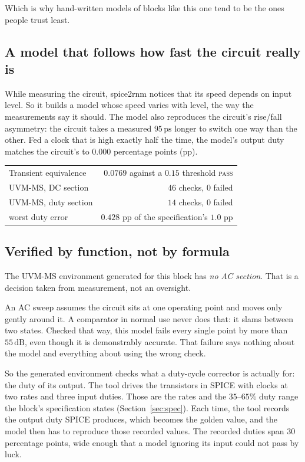 \documentclass[11pt,a4paper]{article}
\newcommand{\pass}{\textcolor{pass}{\textsc{pass}}}
\newcommand{\unit}[1]{\,\textrm{#1}}
\begin{document}
Which is why hand-written models of blocks like this one tend to be
the ones people trust least.

\subsection{A model that follows how fast the circuit really is}

While measuring the circuit, spice2rnm notices that its speed
depends on input level. So it builds a model whose speed varies with
level, the way the measurements say it should. The model also
reproduces the circuit's rise/fall asymmetry: the circuit takes a
measured $95\unit{ps}$ longer to switch one way than the other. Fed a
clock that is high exactly half the time, the model's output duty
matches the circuit's to $0.000$ percentage points (pp).

\begin{center}
\begin{tabular}{@{}lr@{}}
\toprule
Transient equivalence   & $0.0769$ against a $0.15$ threshold \quad \pass \\
UVM-MS, DC section      & $46$ checks, $0$ failed \\
UVM-MS, duty section    & $14$ checks, $0$ failed \\
\quad worst duty error  & $0.428$ pp of the specification's $1.0$ pp \\
\bottomrule
\end{tabular}
\end{center}

\subsection{Verified by function, not by formula}

The UVM-MS environment generated for this block has \emph{no AC
section}. That is a decision taken from measurement, not an oversight.

An AC sweep assumes the circuit sits at one operating point and moves
only gently around it. A comparator in normal use never does that: it
slams between two states. Checked that way, this model fails every
single point by more than $55\unit{dB}$, even though it is
demonstrably accurate. That failure says nothing about the model and
everything about using the wrong check.

So the generated environment checks what a duty-cycle corrector is
actually for: the duty of its output. The tool drives the transistors
in SPICE with clocks at two rates and three input duties. Those are
the rates and the $35$--$65\%$ duty range the block's specification
states (Section~\ref{sec:spec}). Each time, the tool records the
output duty SPICE produces, which becomes the golden value, and the
model then has to reproduce those recorded values. The recorded duties
span $30$ percentage points, wide enough that a model ignoring its
input could not pass by luck.
\end{document}
